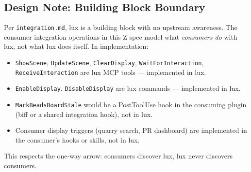 \documentclass[a4paper,10pt,fleqn]{article}
\begin{document}
\subsection{Design Note: Building Block Boundary}

Per \texttt{integration.md}, lux is a building block with no upstream
awareness. The consumer integration operations in this Z spec model
what \emph{consumers do} with lux, not what lux does itself. In
implementation:

\begin{itemize}
  \item \texttt{ShowScene}, \texttt{UpdateScene}, \texttt{ClearDisplay},
    \texttt{WaitForInteraction}, \texttt{ReceiveInteraction} are lux
    MCP tools --- implemented in lux.
  \item \texttt{EnableDisplay}, \texttt{DisableDisplay} are lux commands
    --- implemented in lux.
  \item \texttt{MarkBeadsBoardStale} would be a PostToolUse hook in the
    consuming plugin (biff or a shared integration hook), not in lux.
  \item Consumer display triggers (quarry search, PR dashboard) are
    implemented in the consumer's hooks or skills, not in lux.
\end{itemize}

This respects the one-way arrow: consumers discover lux, lux never
discovers consumers.
\end{document}

